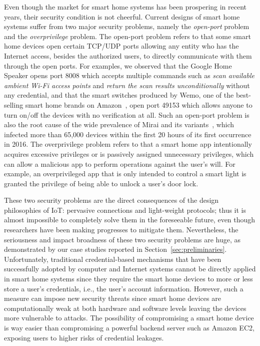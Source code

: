 \documentclass[letterpaper,12pt]{article}
\begin{document}
Even though the market for smart home systems has been prospering in recent years, their security condition is not cheerful. Current designs of smart home systems suffer from two major security problems, namely the \emph{open-port} problem and the \emph{overprivilege} problem. The open-port problem refers to that some smart home devices open certain TCP/UDP ports allowing any entity who has the Internet access, besides the authorized users, to directly communicate with them through the open ports. For examples, we observed that the Google Home Speaker opens port 8008 which accepts multiple commands such as \emph{scan available ambient Wi-Fi access points} and \emph{return the scan results unconditionally} without any credential, and that the smart switches produced by Wemo, one of the best-selling smart home brands on Amazon~\cite{bestselling}, open port 49153 which allows anyone to turn on/off the devices with no verification at all. Such an open-port problem is also the root cause of the wide prevalence of Mirai and its variants~\cite{antonakakis2017understanding}, which infected more than 65,000 devices within the first 20 hours of its first occurrence in 2016. The overprivilege problem refers to that a smart home app intentionally acquires excessive privileges or is passively assigned unnecessary privileges, which can allow a malicious app to perform operations against the user's will. For example, an overprivileged app that is only intended to control a smart light is granted the privilege of being able to unlock a user's door lock. 

These two security problems are the direct consequences of the design philosophies of IoT: pervasive connections and light-weight protocols; thus it is almost impossible to completely solve them in the foreseeable future, even though researchers have been making progresses to mitigate them. Nevertheless, the seriousness and impact broadness of these two security problems are huge, as demonstrated by our case studies reported in Section~\ref{sec:preliminaries}. Unfortunately, traditional credential-based mechanisms that have been successfully adopted by computer and Internet systems cannot be directly applied in smart home systems since they require the smart home devices to more or less store a user's credentials, i.e., the user's account information. However, such a measure can impose new security threats since smart home devices are computationally weak at both hardware and software levels leaving the devices more vulnerable to attacks. The possibility of compromising a smart home device is way easier than compromising a powerful backend server such as Amazon EC2, exposing users to higher risks of credential leakages.
\end{document}
